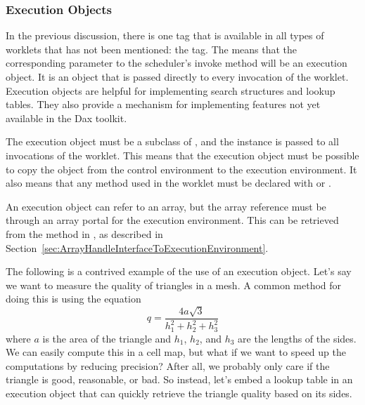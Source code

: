 

\subsubsection{Execution Objects}


In the previous discussion, there is one \controlsignature tag that is
available in all types of worklets that has not been mentioned: the
 tag. The  means that the
corresponding parameter to the scheduler's invoke method will be an
execution object. It is an object that is passed directly to every
invocation of the worklet. Execution objects are helpful for implementing
search structures and lookup tables. They also provide a mechanism for
implementing features not yet available in the Dax toolkit.

The execution object must be a subclass of ,
and the instance is passed to all invocations of the worklet. This means
that the execution object must be possible to copy the object from the
control environment to the execution environment. It also means that any
method used in the worklet must be declared with
 or .

An execution object can refer to an array, but the array reference must be
through an array portal for the execution environment. This can be
retrieved from the  method in
, as described in
Section~\ref{sec:ArrayHandleInterfaceToExecutionEnvironment}.

The following is a contrived example of the use of an execution
object. Let's say we want to measure the quality of triangles in a mesh. A
common method for doing this is using the equation
\begin{equation*}
  q = \frac{4a\sqrt{3}}{h_1^2 + h_2^2 + h_3^2}
\end{equation*}
where $a$ is the area of the triangle and $h_1$, $h_2$, and $h_3$ are the
lengths of the sides. We can easily compute this in a cell map, but what if
we want to speed up the computations by reducing precision? After all, we
probably only care if the triangle is good, reasonable, or bad. So instead,
let's embed a lookup table in an execution object that can quickly retrieve
the triangle quality based on its sides.

